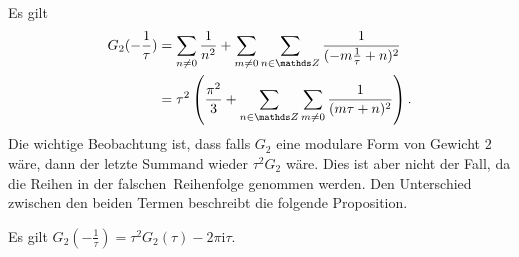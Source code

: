 Es gilt
\begin{align*}
G_2(-\frac{1}{\tau})&=\sum_{n\not =0} \frac{1}{n^2} + \sum_{m \not= 0} \sum_{n\in \Z} \frac{1}{(-m\frac{1}{\tau}+n)^2}\\
&=\tau^2 \left(\frac{\pi^2}{3}+\sum_{n \in \Z}\sum_{m \not =0} \frac{1}{(m\tau+n)^2}\right).
\end{align*}
Die wichtige Beobachtung ist, dass falls $G_2$ eine modulare Form von Gewicht $2$ wäre, dann der letzte Summand wieder $\tau^2 G_2$ wäre.
Dies ist aber nicht der Fall, da die Reihen in der \glqq falschen\grqq\ Reihenfolge genommen werden.
Den Unterschied zwischen den beiden Termen beschreibt die folgende Proposition.

\begin{prop}
Es gilt $G_2(-\frac{1}{\tau})=\tau^2 G_2(\tau)-2\pi \mathrm{i}\tau$.
\end{prop}
